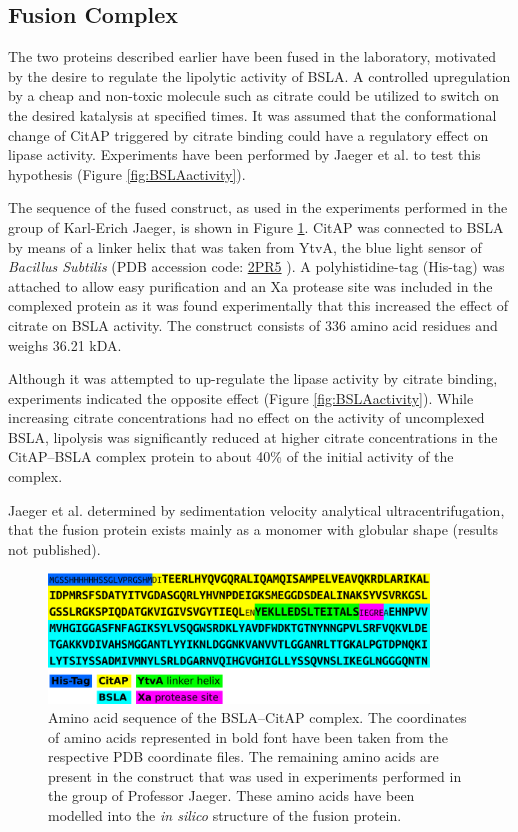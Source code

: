 \documentclass[english, a4paper, 12pt, titlepage, draft]{article}
\newcommand{\PDB}[1]{
    \href{http://pdb.rcsb.org/pdb/explore/explore.do?structureId=#1}{#1}
}
\begin{document}
\subsection{Fusion Complex}

The two proteins described earlier have been fused in the laboratory, motivated by the desire to regulate the lipolytic activity of BSLA.
A controlled upregulation by a cheap and non-toxic molecule such as citrate could be utilized to switch on the desired katalysis at specified times.
It was assumed that the conformational change of CitAP triggered by citrate binding could have a regulatory effect on lipase activity.
Experiments have been performed by Jaeger et al. to test this hypothesis (Figure \ref{fig:BSLAactivity}).

The sequence of the fused construct, as used in the experiments performed in the group of Karl-Erich Jaeger, is shown in Figure \ref{fig:complex_sequence}.
CitAP was connected to BSLA by means of a linker helix that was taken from YtvA, the blue light sensor of \textit{Bacillus Subtilis} (PDB accession code: \PDB{2PR5}).
A polyhistidine-tag (His-tag) was attached to allow easy purification and
an Xa protease site was included in the complexed protein as it was found experimentally that this increased the effect of citrate on BSLA activity.
The construct consists of 336 amino acid residues and weighs 36.21 kDA.

Although it was attempted to up-regulate the lipase activity by citrate binding, experiments indicated the opposite effect (Figure \ref{fig:BSLAactivity}).
While increasing citrate concentrations had no effect on the activity of uncomplexed BSLA, lipolysis was significantly reduced at higher citrate concentrations in the CitAP--BSLA complex protein to about 40\% of the initial activity of the complex.

Jaeger et al. determined by sedimentation velocity analytical ultracentrifugation, that the fusion protein exists mainly as a monomer with globular shape (results not published).




\begin{figure}
    \centering
    \includegraphics[width=0.9\textwidth]{figures/Complex_sequence/Complex_sequence.pdf}
    \caption{Amino acid sequence of the BSLA--CitAP complex. The coordinates of amino acids represented in bold font have been taken from the respective PDB coordinate files.
    The remaining amino acids are present in the construct that was used in experiments performed in the group of Professor Jaeger. These amino acids have been modelled into the \emph{in silico} structure of the fusion protein.}
    \label{fig:complex_sequence}
\end{figure}       
\end{document}
